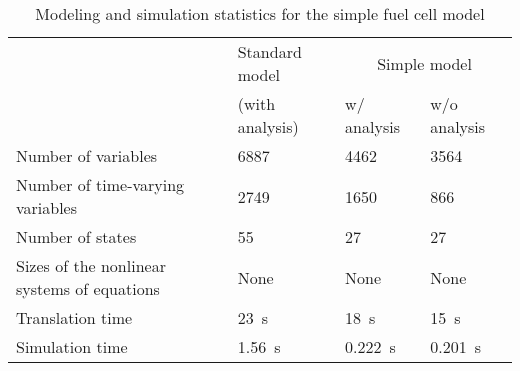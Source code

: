 \begin{table}[h]
  \caption{Modeling and simulation statistics for the simple fuel cell model}
  \label{tab:SimpleStatistics}
  \begin{singlespaced}%
    \begin{tabular}{llll}%
        \toprule 
      & Standard model & \multicolumn{2}{c}{Simple model} \\
      \cmidrule{3-4}
      & (with analysis) & w/ analysis & w/o analysis \\
        \midrule
      Number of variables & 6887 & 4462 & 3564 \\
      Number of time-varying variables & 2749 & 1650 & 866 \\
      Number of states & 55 & 27 & 27 \\
      Sizes of the nonlinear systems of equations & None & None & None \\
      Translation time & \SI{23}{s} & \SI{18}{s} & \SI{15}{s} \\
      Simulation time & \SI{1.56}{s} & \SI{0.222}{s} &  \SI{0.201}{s} \\
      \bottomrule
    \end{tabular}
  \end{singlespaced}
\end{table}
